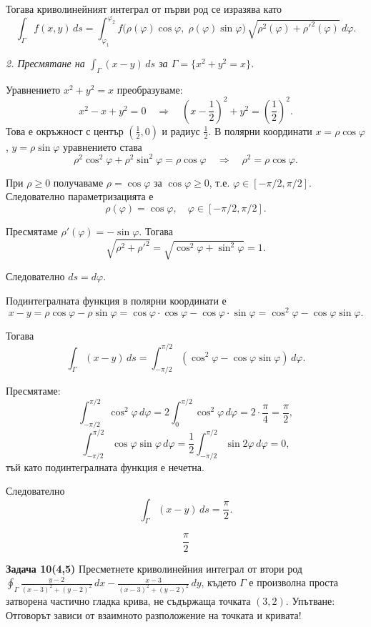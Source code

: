 \documentclass[10pt]{article}
\begin{document}
Тогава криволинейният интеграл от първи род се изразява като
\[
\int_\Gamma f(x,y)\,ds = \int_{\varphi_1}^{\varphi_2} f\bigl(\rho(\varphi)\cos\varphi,\; \rho(\varphi)\sin\varphi\bigr) \, \sqrt{\rho^2(\varphi) + \rho'^2(\varphi)} \, d\varphi.
\]

\textit{2. Пресмятане на $\int_\Gamma (x-y)\,ds$ за $\Gamma = \{x^2+y^2=x\}$.}

Уравнението $x^2+y^2=x$ преобразуваме:
\[
x^2 - x + y^2 = 0 \quad \Longrightarrow \quad \left(x - \frac{1}{2}\right)^2 + y^2 = \left(\frac{1}{2}\right)^2.
\]
Това е окръжност с център $\left(\frac{1}{2},0\right)$ и радиус $\frac{1}{2}$. В полярни координати $x = \rho\cos\varphi$, $y = \rho\sin\varphi$ уравнението става
\[
\rho^2\cos^2\varphi + \rho^2\sin^2\varphi = \rho\cos\varphi \quad \Longrightarrow \quad \rho^2 = \rho\cos\varphi.
\]

При $\rho \ge 0$ получаваме $\rho = \cos\varphi$ за $\cos\varphi \ge 0$, т.е. $\varphi \in [-\pi/2,\pi/2]$. Следователно параметризацията е
\[
\rho(\varphi) = \cos\varphi, \quad \varphi \in [-\pi/2,\pi/2].
\]

Пресмятаме $\rho'(\varphi) = -\sin\varphi$. Тогава
\[
\sqrt{\rho^2 + \rho'^2} = \sqrt{\cos^2\varphi + \sin^2\varphi} = 1.
\]

Следователно $ds = d\varphi$.

Подинтегралната функция в полярни координати е
\[
x - y = \rho\cos\varphi - \rho\sin\varphi = \cos\varphi \cdot \cos\varphi - \cos\varphi \cdot \sin\varphi = \cos^2\varphi - \cos\varphi\sin\varphi.
\]

Тогава
\[
\int_\Gamma (x-y)\,ds = \int_{-\pi/2}^{\pi/2} (\cos^2\varphi - \cos\varphi\sin\varphi) \, d\varphi.
\]

Пресмятаме:
\[
\int_{-\pi/2}^{\pi/2} \cos^2\varphi \, d\varphi = 2\int_0^{\pi/2} \cos^2\varphi \, d\varphi = 2 \cdot \frac{\pi}{4} = \frac{\pi}{2},
\]
\[
\int_{-\pi/2}^{\pi/2} \cos\varphi\sin\varphi \, d\varphi = \frac12 \int_{-\pi/2}^{\pi/2} \sin 2\varphi \, d\varphi = 0,
\]
тъй като подинтегралната функция е нечетна.

Следователно
\[
\int_\Gamma (x-y)\,ds = \frac{\pi}{2}.
\]

\[
\boxed{\frac{\pi}{2}}
\]


\textbf{Задача 10(4,5) }Пресметнете криволинейния интеграл от втори род $\oint_\Gamma \frac{y-2}{(x-3)^2+(y-2)^2}\,dx - \frac{x-3}{(x-3)^2+(y-2)^2}\,dy$, където $\Gamma$ е произволна проста затворена частично гладка крива, не съдържаща точката $(3,2)$. Упътване: Отговорът зависи от взаимното разположение на точката и кривата!
\end{document}
